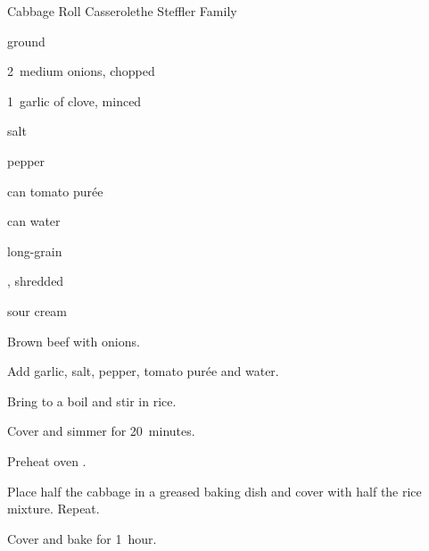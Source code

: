 \begin{recipe}{Cabbage Roll Casserole}{the Steffler Family}{}

\begin{ingredients}
\item \lbs{1\half} ground 
\item 2~medium onions, chopped
\item 1~garlic of clove, minced
\item {} salt
\item \tp{\quarter} pepper
\item {} can tomato pur\'ee
\item {} can water
\item \C{\half} long-grain 
\item {} , shredded
\item sour cream
\end{ingredients}

\begin{directions}
\item Brown beef with onions.
\item Add garlic, salt, pepper, tomato pur\'ee and water.
\item Bring to a boil and stir in rice.
\item Cover and simmer for 20~minutes.
\item Preheat oven .
\item Place half the cabbage in a greased baking dish and cover with half the rice mixture. Repeat.
\item Cover and bake for 1~hour.
\end{directions}

\end{recipe}
